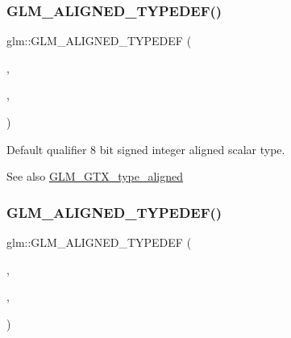\subsubsection{\texorpdfstring{G\+L\+M\+\_\+\+A\+L\+I\+G\+N\+E\+D\+\_\+\+T\+Y\+P\+E\+D\+E\+F()}{GLM\_ALIGNED\_TYPEDEF()}\hspace{0.1cm}{\footnotesize\ttfamily [45/209]}}
{\footnotesize\ttfamily glm\+::\+G\+L\+M\+\_\+\+A\+L\+I\+G\+N\+E\+D\+\_\+\+T\+Y\+P\+E\+D\+EF (\begin{DoxyParamCaption}\item[{\mbox{\hyperlink{group__gtc__type__precision_gaae064be68b7d36cd7910c16e8ad18bba}{i8}}}]{,  }\item[{aligned\+\_\+i8}]{,  }\item[{1}]{ }\end{DoxyParamCaption})}

Default qualifier 8 bit signed integer aligned scalar type. \begin{DoxySeeAlso}{See also}
\mbox{\hyperlink{group__gtx__type__aligned}{G\+L\+M\+\_\+\+G\+T\+X\+\_\+type\+\_\+aligned}} 
\end{DoxySeeAlso}
\mbox{\label{group__gtx__type__aligned_gabd786bdc20a11c8cb05c92c8212e28d3}} 
\subsubsection{\texorpdfstring{G\+L\+M\+\_\+\+A\+L\+I\+G\+N\+E\+D\+\_\+\+T\+Y\+P\+E\+D\+E\+F()}{GLM\_ALIGNED\_TYPEDEF()}\hspace{0.1cm}{\footnotesize\ttfamily [46/209]}}
{\footnotesize\ttfamily glm\+::\+G\+L\+M\+\_\+\+A\+L\+I\+G\+N\+E\+D\+\_\+\+T\+Y\+P\+E\+D\+EF (\begin{DoxyParamCaption}\item[{\mbox{\hyperlink{group__gtc__type__precision_ga35e5542ca05b29cc256fdafb8503d1fd}{i16}}}]{,  }\item[{aligned\+\_\+i16}]{,  }\item[{2}]{ }\end{DoxyParamCaption})}

